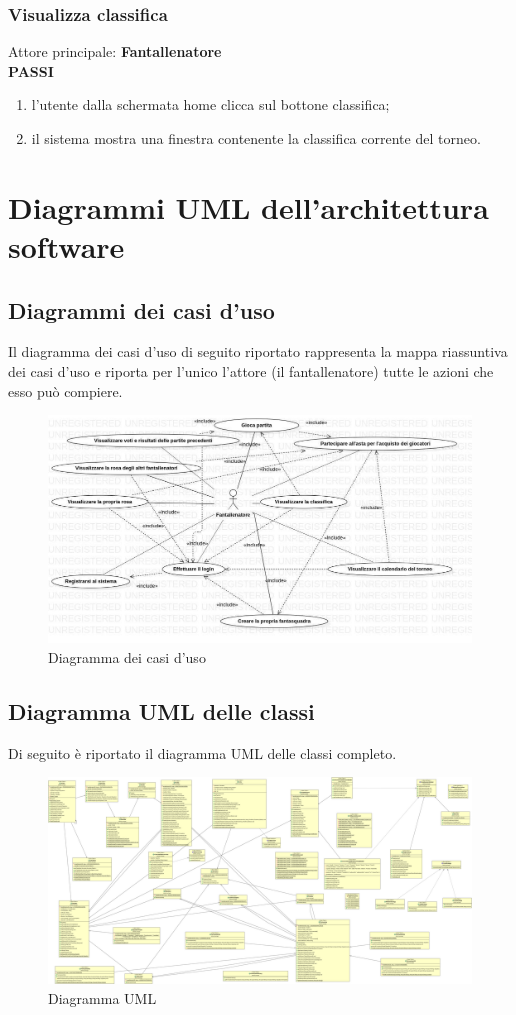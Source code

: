 \documentclass[12pt,a4paper]{article}
\begin{document}
\subsubsection{Visualizza classifica}
Attore principale: \textbf{Fantallenatore}\\
\newline
\textbf{PASSI}
\begin{enumerate}
\item l'utente dalla schermata home clicca sul bottone classifica;
\item il sistema mostra una finestra contenente la classifica corrente del torneo.
\end{enumerate}
\newpage
\section{Diagrammi UML dell'architettura software}
\subsection{Diagrammi dei casi d'uso}
Il diagramma dei casi d'uso di seguito riportato rappresenta la mappa riassuntiva dei casi d'uso  e riporta per l'unico l'attore (il fantallenatore) tutte le azioni che esso può compiere.
\begin{figure}[h]
\centering
\includegraphics[width=15 cm,keepaspectratio]{diagrammaCasiUso.jpg}
\caption{Diagramma dei casi d'uso}
\end{figure}
\subsection{Diagramma UML delle classi}
Di seguito è riportato il diagramma UML delle classi completo.
\begin{figure}[h]
\centering
\includegraphics[width=15 cm,keepaspectratio]{FANTAUNIPA.png}
\caption{Diagramma UML}
\end{figure}
\end{document}
